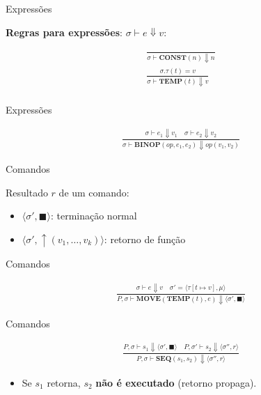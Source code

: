 \begin{frame}{Expressões}

    \textbf{Regras para expressões}: \(\sigma \vdash e \Downarrow v\):

    \[
    \begin{array}{c}
        \frac{}{\sigma \vdash \mathbf{CONST}(n) \Downarrow n} \\
        \frac{\sigma.\tau(t) = v}{\sigma \vdash \mathbf{TEMP}(t) \Downarrow v}\\
    \end{array}
    \]
\end{frame}

\begin{frame}{Expressões}

    \[
    \begin{array}{c}
        \frac{\sigma \vdash e_1 \Downarrow v_1 \quad \sigma \vdash e_2 \Downarrow v_2}
        {\sigma \vdash \mathbf{BINOP}(\mathit{op}, e_1, e_2) \Downarrow \mathit{op}(v_1, v_2)}
    \end{array}
    \]
\end{frame}

\begin{frame}{Comandos}

    Resultado \(r\) de um comando:

    \begin{itemize}

        \item
        \(\langle \sigma', \blacksquare \rangle\): terminação normal
        \item
        \(\langle \sigma', \uparrow (v_1,\ldots,v_k) \rangle\): retorno de
        função
    \end{itemize}
\end{frame}

\begin{frame}{Comandos}

    \[
    \begin{array}{c}
        \frac{\sigma \vdash e \Downarrow v \quad \sigma' = \langle \tau[t \mapsto v], \mu \rangle}
        {P, \sigma \vdash \mathbf{MOVE}(\mathbf{TEMP}(t), e) \Downarrow \langle \sigma', \blacksquare \rangle}
    \end{array}
    \]
\end{frame}

\begin{frame}{Comandos}

    \[
    \begin{array}{c}
        \frac{P, \sigma \vdash s_1 \Downarrow \langle \sigma', \blacksquare \rangle \quad P, \sigma' \vdash s_2 \Downarrow \langle \sigma'', r \rangle}{P, \sigma \vdash \mathbf{SEQ}(s_1, s_2) \Downarrow \langle \sigma'', r \rangle}
    \end{array}
    \]

    \begin{itemize}

        \item
        Se \(s_1\) retorna, \(s_2\) \textbf{não é executado} (retorno
        propaga).
    \end{itemize}
\end{frame}


